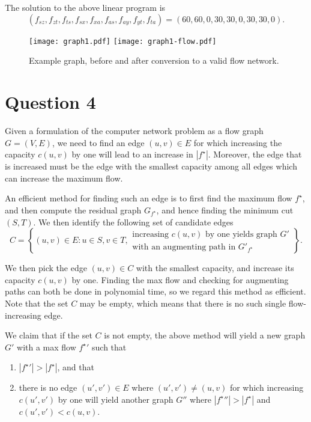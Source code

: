 \documentclass[a4paper, 10pt, oneside, article]{memoir}
\begin{document}
The solution to the above linear program is
$$(f_{sz}, f_{zt}, f_{ts}, f_{sx}, f_{xa}, f_{as}, f_{ay}, f_{yt}, f_{ta}) = (60, 60, 0, 30, 30, 0, 30, 30, 0).$$

\begin{figure}[h]
  \centering
  \texttt{[image: graph1.pdf]}
  \texttt{[image: graph1-flow.pdf]}
  \caption{Example graph, before and after conversion to a valid flow
    network.}
  \label{fig:example-graph}
\end{figure}

\section*{Question 4}

Given a formulation of the computer network problem as a flow graph
$G=(V,E)$, we need to find an edge $(u,v) \in E$ for which increasing
the capacity $c(u,v)$ by one will lead to an increase in
$|f^\star|$. Moreover, the edge that is increased must be the edge
with the smallest capacity among all edges which can increase the
maximum flow.

An efficient method for finding such an edge is to first find the
maximum flow $f^\star$, and then compute the residual graph
$G_{f^\star}$, and hence finding the minimum cut $(S,T)$. We then
identify the following set of candidate edges
$$
 C = \left\{ (u,v) \in E : u \in S, v \in T,
\substack{\text{increasing $c(u,v)$ by one yields graph $G'$} \\ \text{with an augmenting path in $G'_{f^\star}$}} \right\}.
$$

We then pick the edge $(u,v) \in C$ with the smallest capacity, and
increase its capacity $c(u,v)$ by one. Finding the max flow and
checking for augmenting paths can both be done in polynomial time, so
we regard this method as efficient. Note that the set $C$ may be
empty, which means that there is no such single flow-increasing edge.

We claim that if the set $C$ is not empty, the above method will yield
a new graph $G'$ with a max flow ${f^\star}'$ such that
\begin{enumerate}
\item $|{f^\star}'| > |f^\star|$, and that
\item there is no edge $(u',v') \in E$ where $(u',v') \not= (u,v)$ for
  which increasing $c(u',v')$ by one will yield another graph $G''$
  where $|{f^\star}''| > |f^\star|$ and $c(u',v') < c(u,v)$.
\end{enumerate}
\end{document}
